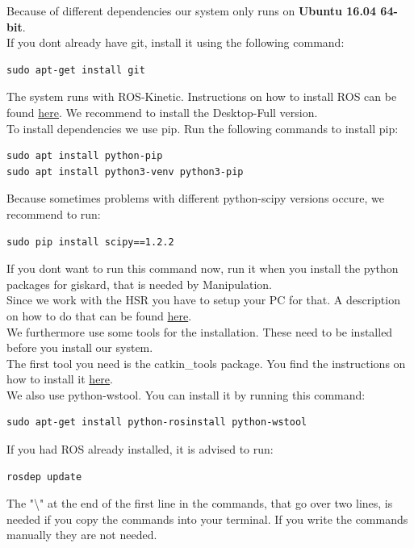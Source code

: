 \documentclass[main.tex]{subfiles}
\begin{document}
	Because of different dependencies our system only runs on \textbf{Ubuntu 16.04 64-bit}.\\
	If you dont already have git, install it using the following command:\\
	\begin{lstlisting}
sudo apt-get install git
\end{lstlisting}
	The system runs with ROS-Kinetic. Instructions on how to install ROS can be found \href{http://wiki.ros.org/kinetic/Installation/Ubuntu}{here}. We recommend to install the Desktop-Full version.\\
	To install dependencies we use pip. Run the following commands to install pip:\\
	\begin{lstlisting}
sudo apt install python-pip
sudo apt install python3-venv python3-pip
\end{lstlisting}
Because sometimes problems with different python-scipy versions occure, we recommend to run:\\
\begin{lstlisting}
sudo pip install scipy==1.2.2
\end{lstlisting}
If you dont want to run this command now, run it when you install the python packages for giskard, that is needed by Manipulation.\\
	Since we work with the HSR you have to setup your PC for that.
	A description on how to do that can be found \href{https://docs.hsr.io/manual_en/howto/pc_install.html}{here}.\\
	We furthermore use some tools for the installation. These need to be installed before you install our system.\\
	The first tool you need is the catkin\_tools package. You find the instructions on how to install it \href{https://catkin-tools.readthedocs.io/en/latest/installing.html}{here}.\\
	We also use python-wstool.
	You can install it by running this command:
	\begin{lstlisting}
sudo apt-get install python-rosinstall python-wstool
\end{lstlisting}

If you had ROS already installed, it is advised to run:
\begin{lstlisting}
rosdep update
\end{lstlisting}
The "\textbackslash" at the end of the first line in the commands, that go over two lines, is needed if you copy the commands into your terminal. If you write the commands manually they are not needed.
	
\end{document}
